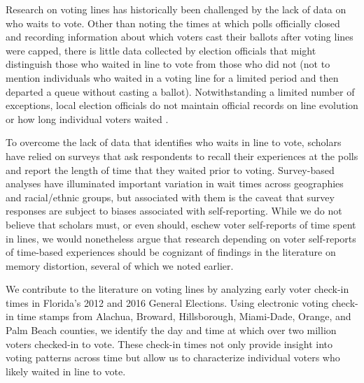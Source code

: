 \documentclass[12pt,titlepage]{article}
\begin{document}
Research on voting lines has historically been challenged by the lack
of data on who waits to vote.  Other than noting the times at which
polls officially closed and recording information about which voters
cast their ballots after voting lines were capped, there is little
data collected by election officials that might distinguish those who
waited in line to vote from those who did not (not to mention
individuals who waited in a voting line for a limited period and then
departed a queue without casting a ballot).  Notwithstanding a limited
number of exceptions, local election officials do not maintain
official records on line evolution or how long individual voters
waited \citep{herron:confidence}.


To overcome the lack of data that identifies who waits in line to
vote, scholars have relied on surveys that ask respondents to recall
their experiences at the polls and report the length of time that they
waited prior to voting.  Survey-based analyses have illuminated
important variation in wait times across geographies and racial/ethnic
groups, but associated with them is the caveat that survey responses
are subject to biases associated with self-reporting.  While we do not
believe that scholars must, or even should, eschew voter self-reports
of time spent in lines, we would nonetheless argue that research
depending on voter self-reports of time-based experiences should be
cognizant of findings in the literature on memory distortion, several
of which we noted earlier.




We contribute to the literature on voting lines by analyzing early
voter check-in times in Florida's 2012 and 2016 General Elections.
Using electronic voting check-in time stamps from Alachua, Broward,
Hillsborough, Miami-Dade, Orange, and Palm Beach counties, we identify
the day and time at which over two million voters checked-in to vote.
These check-in times not only provide insight into voting patterns
across time but allow us to characterize individual voters who likely
waited in line to vote.
\end{document}
